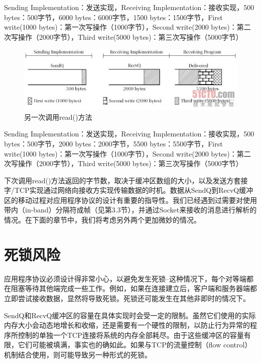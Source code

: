 	Sending Implementation：发送实现，Receiving Implementation：接收实现，500 bytes：500字节，6000 bytes：6000字节，1500 bytes：1500字节，First write(1000 bytes)：第一次写操作（1000字节），Second write(2000 bytes)：第二次写操作（2000字节），Third write(5000 bytes)：第三次写操作（5000字节）

	\clearpage

	\begin{figure}[htbp]%
		\centering
		\includegraphics[scale=.6]{img/06.04.jpg}
		\caption{另一次调用read()方法}
		\label{fig:another.call.read.func}
	\end{figure}

	Sending Implementation：发送实现，Receiving Implementation：接收实现，500 bytes：500字节，2000 bytes：2000字节，5500 bytes：5500字节，First write(1000 bytes)：第一次写操作（1000字节），Second write(2000 bytes)：第二次写操作（2000字节），Third write(5000 bytes)：第三次写操作（5000字节）

	下次调用read()方法返回的字节数，取决于缓冲区数组的大小，以及发送方套接字/TCP实现通过网络向接收方实现传输数据的时机。数据从SendQ到RecvQ缓冲区的移动过程对应用程序协议的设计有重要的指导性。我们已经遇到过需要对使用带内（in-band）分隔符成帧（见第3.3节），并通过Socket来接收的消息进行解析的情况。在下面的章节中，我们将考虑另外两个更加微妙的情况。

\section{死锁风险}

	应用程序协议必须设计得非常小心，以避免发生死锁--这种情况下，每个对等端都在阻塞等待其他端完成一些工作。例如，如果在连接建立后，客户端和服务器端都立即尝试接收数据，显然将导致死锁。死锁还可能发生在其他非即时的情况下。

	SendQ和RecvQ缓冲区的容量在具体实现时会受一定的限制。虽然它们使用的实际内存大小会动态地增长和收缩，还是需要有一个硬性的限制，以防止行为异常的程序所控制的单独一个TCP连接将系统的内存全部耗尽。由于这些缓冲区的容量有限，它们可能被填满，事实也的确如此。如果与TCP的流量控制（flow control）机制结合使用，则可能导致另一种形式的死锁。

